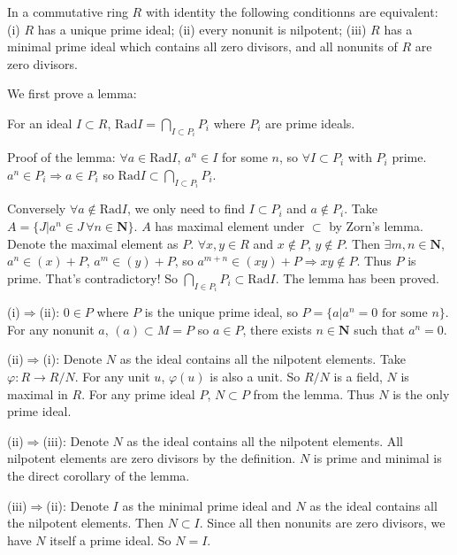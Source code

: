 $$ $$

\begin{ex}
    In a commutative ring $R$ with identity the following conditionns are equivalent: (i) $R$ has a unique prime ideal; (ii) every nonunit is nilpotent; (iii) $R$ has a minimal prime ideal which contains all zero divisors, and all nonunits of $R$ are zero divisors.
\end{ex}

\begin{answer}
    We first prove a lemma:
    \begin{lemma}
        For an ideal $I\subset R$, $\mathrm{Rad}I=\bigcap\limits_{I\subset P_{i}}P_{i}$ where $P_{i}$ are prime ideals.
    \end{lemma}

    Proof of the lemma: $\forall a\in \mathrm{Rad} I$, $a^{n}\in I$ for some $n$, so $\forall I\subset P_{i}$ with $P_{i}$ prime. $a^{n}\in P_{i}\Rightarrow a\in P_{i}$ so $\mathrm{Rad}I\subset \bigcap\limits_{I\subset P_{i}}P_{i}$.
    
    Conversely $\forall a\notin \mathrm{Rad}I$, we only need to find $I\subset P_{i}$ and $a\notin P_{i}$. Take $A=\{J|a^{n}\in J\, \forall n\in \mathbf{N}\}$. $A$ has maximal element under $\subset$ by Zorn's lemma. Denote the maximal element as $P$. $\forall x,y\in R$ and $x\notin P$, $y\notin P$. Then $\exists m,n\in\mathbf{N}$, $a^{n}\in (x)+P$, $a^{m}\in (y)+P$, so $a^{m+n}\in(xy)+P\Rightarrow xy\notin P$. Thus $P$ is prime. That's contradictory! So $\bigcap\limits_{I\in P_{i}}P_{i}\subset \mathrm{Rad}I$. The lemma has been proved.

    (i)$\Rightarrow$(ii): $0\in P$ where $P$ is the unique prime ideal, so $P=\{a|a^{n}=0 \text{ for some } n\}$. For any nonunit $a$, $(a)\subset M=P$ so $a\in P$, there exists $n\in\mathbf{N}$ such that $a^{n}=0$.

    (ii)$\Rightarrow$(i): Denote $N$ as the ideal contains all the nilpotent elements. Take $\varphi:R\to R /N$. For any unit $u$, $\varphi(u)$ is also a unit. So $R /N$ is a field, $N$ is maximal in $R$. For any prime ideal $P$, $N\subset P$ from the lemma. Thus $N$ is the only prime ideal.

    (ii)$\Rightarrow$(iii): Denote $N$ as the ideal contains all the nilpotent elements. All nilpotent elements are zero divisors by the definition. $N$ is prime and minimal is the direct corollary of the lemma.

    (iii)$\Rightarrow$(ii): Denote $I$ as the minimal prime ideal and $N$ as the ideal contains all the nilpotent elements. Then $N\subset I$. Since all then nonunits are zero divisors, we have $N$ itself a prime ideal. So $N=I$.
\end{answer}

